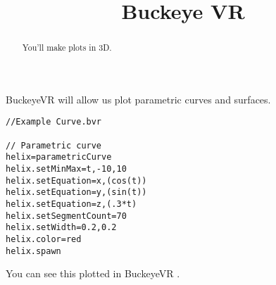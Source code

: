 \documentclass{ximera}
\title{Buckeye VR}
\begin{document}
\begin{abstract}
  You'll make plots in 3D.
\end{abstract}
\maketitle

BuckeyeVR will allow us plot parametric curves and surfaces.

\begin{verbatim}
//Example Curve.bvr

// Parametric curve
helix=parametricCurve
helix.setMinMax=t,-10,10
helix.setEquation=x,(cos(t))
helix.setEquation=y,(sin(t))
helix.setEquation=z,(.3*t)
helix.setSegmentCount=70
helix.setWidth=0.2,0.2
helix.color=red
helix.spawn
\end{verbatim}

You can see this plotted in BuckeyeVR .
\end{document}
